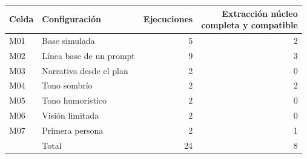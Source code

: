 \begin{tabular}{@{}llrr@{}}
\toprule
Celda & Configuración & Ejecuciones & \shortstack{Extracción núcleo\\completa y compatible} \\
\midrule
M01 & Base simulada & 5 & 2 \\
M02 & Línea base de un prompt & 9 & 3 \\
M03 & Narrativa desde el plan & 2 & 0 \\
M04 & Tono sombrío & 2 & 2 \\
M05 & Tono humorístico & 2 & 0 \\
M06 & Visión limitada & 2 & 0 \\
M07 & Primera persona & 2 & 1 \\
 & Total & 24 & 8 \\
\bottomrule
\end{tabular}
